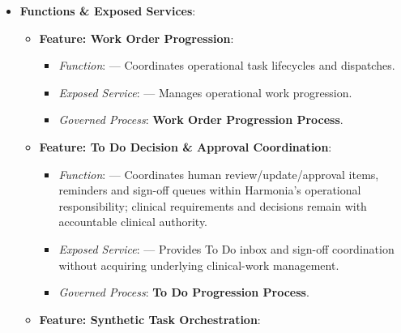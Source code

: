 \begin{itemize}
\item 
\textbf{Functions \& Exposed Services}:


\begin{itemize}

\item 
\textbf{Feature: Work Order Progression}:


\begin{itemize}

\item 
\emph{Function}: \texttt{} — Coordinates operational task lifecycles and dispatches.



\item 
\emph{Exposed Service}: \texttt{} — Manages operational work progression.



\item 
\emph{Governed Process}: \textbf{Work Order Progression Process}.



\end{itemize}


\item 
\textbf{Feature: To Do Decision \& Approval Coordination}:


\begin{itemize}

\item 
\emph{Function}: \texttt{} — Coordinates human review/\allowbreak{}update/\allowbreak{}approval items, reminders and sign-off queues within Harmonia's operational responsibility; clinical requirements and decisions remain with accountable clinical authority.



\item 
\emph{Exposed Service}: \texttt{} — Provides To Do inbox and sign-off coordination without acquiring underlying clinical-work management.



\item 
\emph{Governed Process}: \textbf{To Do Progression Process}.



\end{itemize}


\item 
\textbf{Feature: Synthetic Task Orchestration}:



\end{itemize}
\end{itemize}
